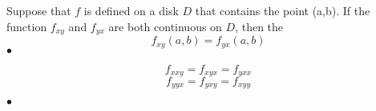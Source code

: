 \begin{theorem}
	Suppose that $f$ is defined on a disk $D$ that contains the point (a,b). If the
	function $f_{xy}$ and $f_{yx}$ are both continuous on $D$, then the \[
	f_{xy}(a,b) = f_{yx}(a,b)\]
\smallskip\hfill$\bullet$\end{theorem}

\begin{corollary}
	\[f_{ x x y} = f_{xyx}= f_{yx x}\]
	\[f_{ y y x} = f_{yxy}= f_{xy y}\]

\smallskip\hfill$\bullet$\end{corollary}









\newpage


